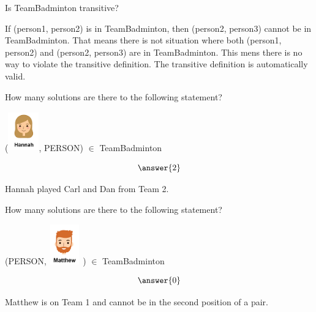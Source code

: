 \documentclass{ximera}
\begin{document}
\begin{exercise}
Is TeamBadminton transitive?

  \begin{multipleChoice}
  \end{multipleChoice}
  \begin{feedback}
If (person1, person2) is in TeamBadminton, then (person2, person3) cannot be in TeamBadminton.  That means there is not situation where both (person1, person2) and (person2, person3) are in TeamBadminton.  This mens there is no way to violate the transitive definition.  The transitive definition is automatically valid.
  \end{feedback}
\end{exercise}




\begin{exercise}
How many solutions are there to the following statement?  

({\includegraphics[width=50px,height=65px]{pics/people/hannah.png}}, PERSON) $\in$ TeamBadminton 

\[  \answer{2} \]

  \begin{feedback}
Hannah played Carl and Dan from Team 2.
  \end{feedback}
\end{exercise}





\begin{exercise}
How many solutions are there to the following statement?  

(PERSON, {\includegraphics[width=50px,height=65px]{pics/people/Matthew.png}} ) $\in$ TeamBadminton 

\[  \answer{0} \]

  \begin{feedback}
Matthew is on Team 1 and cannot be in the second position of a pair.
  \end{feedback}
\end{exercise}
\end{document}
